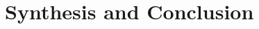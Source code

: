 \documentclass[12pt, a4paper, openany]{book}
\theoremstyle{plain}
\theoremstyle{definition}
\begin{document}
\mainmatter

\part{Synthesis and Conclusion}
\label{part:conclusion}



\cleardoublepage
{}
{}
\printbibliography[title={Bibliography}]
\end{document}
